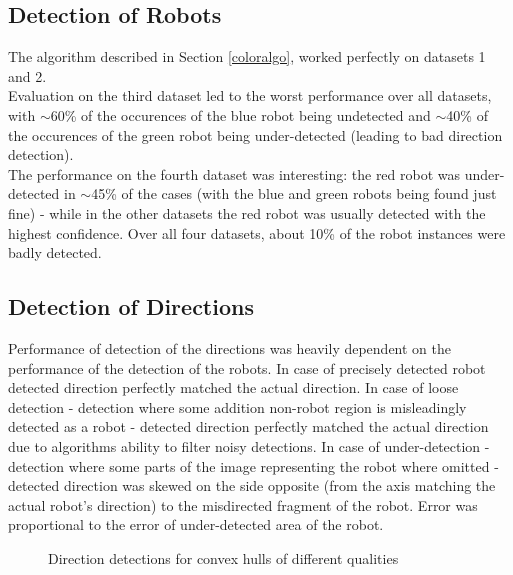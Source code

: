 \documentclass[10pt,a4paper]{article}
\begin{document}
\subsection{Detection of Robots}\label{colorresults}
The algorithm described in Section \ref{coloralgo}, worked perfectly on 
datasets 1 and 2.\\
Evaluation on the third dataset led to the worst performance over all datasets, 
with $\sim$60\% of the occurences of the blue robot being undetected and 
$\sim$40\% of the occurences of the green robot being under-detected (leading 
to bad direction detection).\\
The performance on the fourth dataset was interesting: the red robot was under-
detected in $\sim$45\% of the cases (with the blue and green robots being
found just fine) - while in the other datasets the red robot was usually
detected with the highest confidence.
Over all four datasets, about 10\% of the robot instances were badly detected.

\subsection{Detection of Directions}\label{directionresults}
Performance of detection of the directions was heavily dependent on the 
performance of the detection of the robots. In case of precisely detected robot 
detected direction perfectly matched the actual direction. 
In case of loose detection - detection where some addition non-robot region is 
misleadingly detected as a robot - detected direction perfectly matched the 
actual direction due to algorithms ability to filter noisy detections. 
In case of under-detection - detection where some parts of the image 
representing the robot where omitted - detected direction was skewed on the 
side opposite (from the axis matching the actual robot's direction) to the 
misdirected fragment of the robot. Error was proportional to the error of 
under-detected area of the robot. 
\begin{figure}[ht]
    \begin{center}
    \end{center}
    \caption{Direction detections for convex hulls of different qualities}
\end{figure} 
\end{document}
